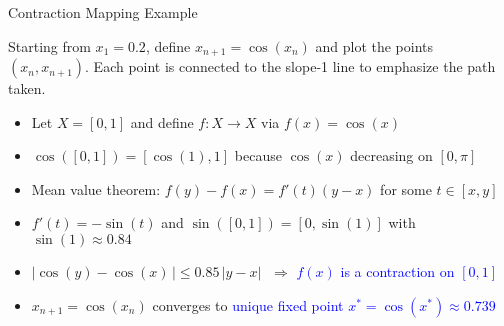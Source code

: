 \documentclass[10pt,english]{beamer}
\begin{document}
\begin{frame}{Contraction Mapping Example}

\begin{minipage}{0.45\textwidth}
Starting from $x_1 = 0.2$, define $x_{n+1}= \cos(x_n)$ and plot the points $(x_n,x_{n+1})$.  Each point is connected to the slope-1 line to emphasize the path taken.
\end{minipage}
\begin{minipage}{0.5\textwidth}
\scalebox{0.75}{}
\end{minipage}
\vspace{1mm}

\begin{itemize}
\setlength\itemsep{1.5mm}
\item<1-> Let $X=[0,1]$ and define $f\colon X\to X$ via $f(x)=\cos(x)$

\item<2-> $\cos([0,1]) = [\cos(1),1]$ because $\cos(x)$ decreasing on $[0,\pi]$

\item<3-> Mean value theorem: $f(y)-f(x) = f'(t) (y-x)$ for some $t\in [x,y]$

\item<4-> $f'(t) = -\sin(t)$ and $\sin([0,1]) = [0,\sin(1)]$ with $\sin(1) \approx 0.84$

\item<5-> $| \cos(y) - \cos(x) \,| \leq 0.85 \, |y-x|$ $\;\Rightarrow$ \textcolor{blue}{$f(x)$ is a contraction on $[0,1]$}

\item<6-> $x_{n+1} \!= \cos(x_n)$  converges to \textcolor{blue}{unique fixed point $x^* \!= \cos(x^*) \!\approx\! 0.739$}
\end{itemize}

\end{frame}  
\end{document}
